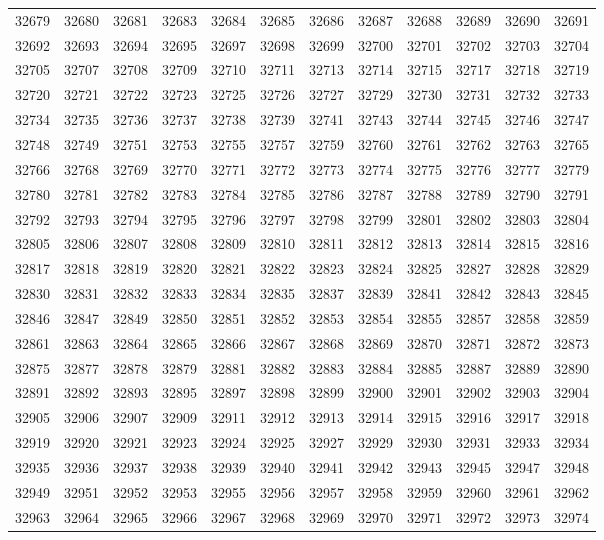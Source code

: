 \begin{center}
\begin{longtable}{llllllllllll}
32679 &32680 &32681 &32683 &32684 &32685 &32686 &32687 &32688 &32689 &32690 &32691 \\
32692 &32693 &32694 &32695 &32697 &32698 &32699 &32700 &32701 &32702 &32703 &32704 \\
32705 &32707 &32708 &32709 &32710 &32711 &32713 &32714 &32715 &32717 &32718 &32719 \\
32720 &32721 &32722 &32723 &32725 &32726 &32727 &32729 &32730 &32731 &32732 &32733 \\
32734 &32735 &32736 &32737 &32738 &32739 &32741 &32743 &32744 &32745 &32746 &32747 \\
32748 &32749 &32751 &32753 &32755 &32757 &32759 &32760 &32761 &32762 &32763 &32765 \\
32766 &32768 &32769 &32770 &32771 &32772 &32773 &32774 &32775 &32776 &32777 &32779 \\
32780 &32781 &32782 &32783 &32784 &32785 &32786 &32787 &32788 &32789 &32790 &32791 \\
32792 &32793 &32794 &32795 &32796 &32797 &32798 &32799 &32801 &32802 &32803 &32804 \\
32805 &32806 &32807 &32808 &32809 &32810 &32811 &32812 &32813 &32814 &32815 &32816 \\
32817 &32818 &32819 &32820 &32821 &32822 &32823 &32824 &32825 &32827 &32828 &32829 \\
32830 &32831 &32832 &32833 &32834 &32835 &32837 &32839 &32841 &32842 &32843 &32845 \\
32846 &32847 &32849 &32850 &32851 &32852 &32853 &32854 &32855 &32857 &32858 &32859 \\
32861 &32863 &32864 &32865 &32866 &32867 &32868 &32869 &32870 &32871 &32872 &32873 \\
32875 &32877 &32878 &32879 &32881 &32882 &32883 &32884 &32885 &32887 &32889 &32890 \\
32891 &32892 &32893 &32895 &32897 &32898 &32899 &32900 &32901 &32902 &32903 &32904 \\
32905 &32906 &32907 &32909 &32911 &32912 &32913 &32914 &32915 &32916 &32917 &32918 \\
32919 &32920 &32921 &32923 &32924 &32925 &32927 &32929 &32930 &32931 &32933 &32934 \\
32935 &32936 &32937 &32938 &32939 &32940 &32941 &32942 &32943 &32945 &32947 &32948 \\
32949 &32951 &32952 &32953 &32955 &32956 &32957 &32958 &32959 &32960 &32961 &32962 \\
32963 &32964 &32965 &32966 &32967 &32968 &32969 &32970 &32971 &32972 &32973 &32974 \\

\end{longtable}
\end{center}

